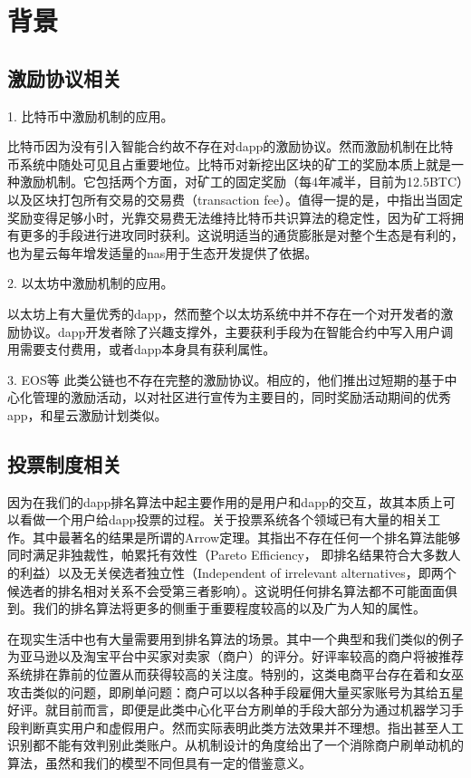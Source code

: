 \section{背景}

\subsection{激励协议相关}
1. 比特币中激励机制的应用。

比特币因为没有引入智能合约故不存在对dapp的激励协议。然而激励机制在比特币系统中随处可见且占重要地位。比特币对新挖出区块的矿工的奖励本质上就是一种激励机制。它包括两个方面，对矿工的固定奖励（每4年减半，目前为12.5BTC）以及区块打包所有交易的交易费（transaction fee）。值得一提的是，\cite{carlsten2016instability}中指出当固定奖励变得足够小时，光靠交易费无法维持比特币共识算法的稳定性，因为矿工将拥有更多的手段进行进攻同时获利。这说明适当的通货膨胀是对整个生态是有利的，也为星云每年增发适量的nas用于生态开发提供了依据。


2. 以太坊中激励机制的应用。

以太坊上有大量优秀的dapp，然而整个以太坊系统中并不存在一个对开发者的激励协议。dapp开发者除了兴趣支撑外，主要获利手段为在智能合约中写入用户调用需要支付费用，或者dapp本身具有获利属性\cite{Fomo3D}。

3. EOS等
此类公链也不存在完整的激励协议。相应的，他们推出过短期的基于中心化管理的激励活动，以对社区进行宣传为主要目的，同时奖励活动期间的优秀app，和星云激励计划\cite{Nabulasincentive}类似。

		
\subsection{投票制度相关}
因为在我们的dapp排名算法中起主要作用的是用户和dapp的交互，故其本质上可以看做一个用户给dapp投票的过程。关于投票系统各个领域已有大量的相关工作。其中最著名的结果是所谓的Arrow定理\cite{arrow1951extension}。其指出不存在任何一个排名算法能够同时满足非独裁性，帕累托有效性（Pareto Efficiency， 即排名结果符合大多数人的利益）以及无关侯选者独立性（Independent of irrelevant alternatives，即两个候选者的排名相对关系不会受第三者影响）。这说明任何排名算法都不可能面面俱到。我们的排名算法将更多的侧重于重要程度较高的以及广为人知的属性。

在现实生活中也有大量需要用到排名算法的场景。其中一个典型和我们类似的例子为亚马逊以及淘宝平台中买家对卖家（商户）的评分。好评率较高的商户将被推荐系统排在靠前的位置从而获得较高的关注度。特别的，这类电商平台存在着和女巫攻击类似的问题，即刷单问题：商户可以以各种手段雇佣大量买家账号为其给五星好评。就目前而言，即便是此类中心化平台方刷单的手段大部分为通过机器学习手段判断真实用户和虚假用户\cite{mukherjee2013spotting,jindal2008opinion,yoo2009comparison}。然而实际表明此类方法效果并不理想。\cite{ott2011finding}指出甚至人工识别都不能有效判别此类账户。\cite{cai2016mechanism}从机制设计的角度给出了一个消除商户刷单动机的算法，虽然和我们的模型不同但具有一定的借鉴意义。

